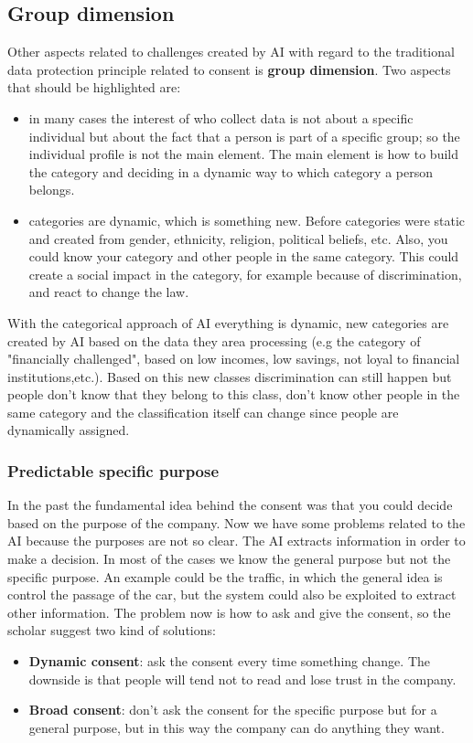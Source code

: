\subsection{Group dimension}
Other aspects related to challenges created by AI with regard to the traditional data protection principle related to consent is \textbf{group dimension}. Two aspects that should be highlighted are:
\begin{itemize}
    \item in many cases the interest of who collect data is not about a specific individual but about the fact that a person is part of a specific group; so the individual profile is not the main element. The main element is how to build the category and deciding in a dynamic way to which category a person belongs.
    \item categories are dynamic, which is something new. Before categories were static and created from gender, ethnicity, religion, political beliefs, etc. Also, you could know your category and other people in the same category. This could create a social impact in the category, for example because of discrimination, and react to change the law. 
\end{itemize}
With the categorical approach of AI everything is dynamic, new categories are created by AI based on the data they area processing (e.g the category of "financially challenged", based on low incomes, low savings, not loyal to financial institutions,etc.). Based on this new classes discrimination can still happen but people don't know that they belong to this class, don't know other people in the same category and the classification itself can change since people are dynamically assigned.

\subsubsection{Predictable specific purpose}
In the past the fundamental idea behind the consent was that you could decide based on the purpose of the company. Now we have some problems related to the AI because the purposes are not so clear. The AI extracts information in order to make a decision. In most of the cases we know the general purpose but not the specific purpose. An example could be the traffic, in which the general idea is control the passage of the car, but the system could also be exploited to extract other information. The problem now is how to ask and give the consent, so the scholar suggest two kind of solutions:
\begin{itemize}
    \item \textbf{Dynamic consent}: ask the consent every time something change. The downside is that people will tend not to read and lose trust in the company.
    \item \textbf{Broad consent}: don't ask the consent for the specific purpose but for a general purpose, but in this way the company can do anything they want.
\end{itemize}

